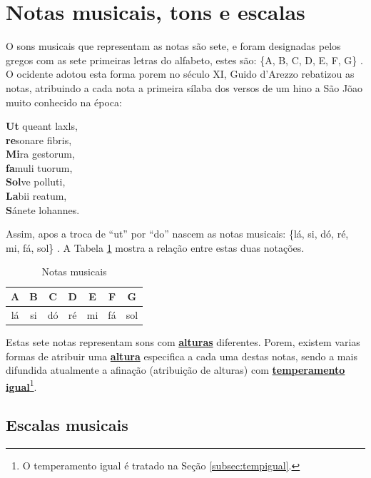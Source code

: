 \section{Notas musicais, tons e escalas}
\label{sec:notasmusicais}

O sons musicais que representam as notas são sete, 
e foram designadas pelos gregos com as sete primeiras letras do alfabeto,
estes são: \{A, B, C, D, E, F, G\} \cite[pp. 11]{grabner2001teoria} \cite[pp. 9]{cardoso1973curso}.
O ocidente adotou esta forma porem no século XI, 
Guido d'Arezzo rebatizou as notas, 
atribuindo a cada nota a primeira sílaba dos versos
de um hino a São Jõao muito conhecido na época:
\begin{citando}%
\textbf{Ut} queant laxls,\\
\textbf{re}sonare fibris,\\
\textbf{Mi}ra gestorum,\\
\textbf{fa}muli tuorum,\\
\textbf{Sol}ve polluti,\\
\textbf{La}bii reatum,\\
\textbf{S}ánete lohannes.
\end{citando}
 Assim, apos a troca de ``ut'' por ``do'' nascem as notas musicais: 
\{lá, si, dó, ré, mi, fá, sol\} \cite[pp. 21]{arbones2012armonia} \cite[pp. 7]{cardoso1973curso}. 
A Tabela \ref{tab:notasmusic} mostra a relação entre estas duas notações.

\begin{table}[h]
\centering
\begin{tabular}{|c|c|c|c|c|c|c|}
\hline
A  & B  & C  & D  & E  & F  & G\\ \hline
lá & si & dó & ré & mi & fá & sol \\ \hline
\end{tabular}
\caption{Notas musicais}
\label{tab:notasmusic}
\end{table}

Estas sete notas representam sons com \hyperref[sec:pos:Altura]{\textbf{alturas}} diferentes.
Porem, existem varias formas de atribuir uma \hyperref[sec:pos:Altura]{\textbf{altura}} 
especifica a cada uma destas notas, 
sendo a mais difundida atualmente a afinação (atribuição de alturas) com \hyperref[subsec:tempigual]{\textbf{temperamento igual}}\footnote{O temperamento igual é tratado na Seção \ref{subsec:tempigual}.}.


\subsection{Escalas musicais}

